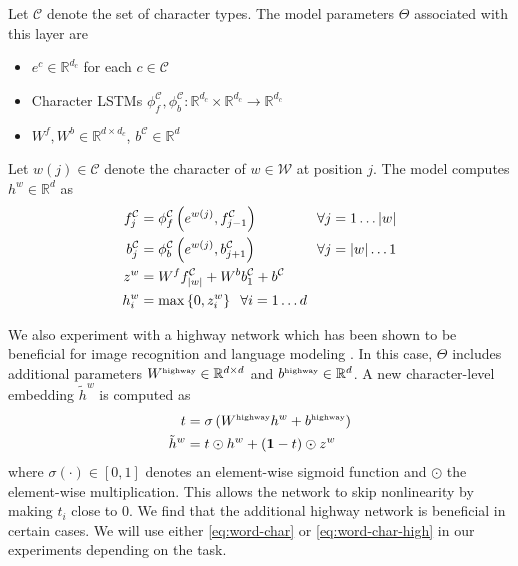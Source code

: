 \documentclass[11pt,letterpaper,UTF8]{article}
\newcommand{\R}{\ensuremath{\mathbb{R}}}
\newcommand{\si}{\ensuremath{\sigma}}
\newcommand{\ra}{\ensuremath{\rightarrow}}
\newcommand{\myset}[1]{\left\{#1\right\}}
\newcommand{\paren}[1]{\left(#1\right)}
\newcommand{\abs}[1]{\left|#1\right|}
\newcommand{\by}{\ensuremath{\times}}
\begin{document}
\begin{CJK}{UTF8}{gbsn}
Let $\mathcal{C}$ denote the set of character types.
The model parameters $\Theta$ associated with this layer are
\begin{itemize}
\item $e^c \in \R^{d_c}$ for each $c \in \mathcal{C}$
\item Character LSTMs $\phi^{\mathcal{C}}_f, \phi^{\mathcal{C}}_b: \R^{d_c} \times \R^{d_c} \ra \R^{d_c}$
\item $W^f, W^b \in \R^{d \by d_c}$,\; $b^{\mathcal{C}} \in \R^d$
\end{itemize}
Let $w(j) \in \mathcal{C}$ denote the character of $w \in \mathcal{W}$ at position $j$.
The model computes $h^w \in \R^d$ as
\begin{align}
f^{\mathcal{C}}_j &= \phi^{\mathcal{C}}_f\paren{e^{w(j)}, f^{\mathcal{C}}_{j-1}} &&\hspace{-1mm}\forall j = 1 \ldots \abs{w}  \notag\\
b^{\mathcal{C}}_j &= \phi^{\mathcal{C}}_b\paren{e^{w(j)}, b^{\mathcal{C}}_{j+1}} &&\hspace{-1mm}\forall j = \abs{w} \ldots 1 \notag\\
z^w &= W^f f^{\mathcal{C}}_{\abs{w}} + W^b b^{\mathcal{C}}_1 + b^{\mathcal{C}} &&\notag\\
h^w_i &= \max\myset{0, z^w_i}\;\; \forall i = 1 \ldots d && \label{eq:word-char}
\end{align}

We also experiment with a highway network \cite{srivastava2015highway} which has been shown to be beneficial for
image recognition \cite{he2015deep} and language modeling \cite{kim2016character}.
In this case, $\Theta$ includes additional parameters $W^{\mbox{\tiny highway}} \in \R^{d \by d}$ and $b^{\mbox{\tiny highway}} \in \R^d$.
A new character-level embedding $\tilde{h}^w$ is computed as
\begin{align}
t &= \si\paren{W^{\mbox{\tiny highway}} h^w + b^{\mbox{\tiny highway}}} \notag \\
\tilde{h}^w &= t \odot h^w + (\textbf{1} - t) \odot z^w \label{eq:word-char-high}
\end{align}
where $\si(\cdot) \in [0,1]$ denotes an element-wise sigmoid function and $\odot$ the element-wise multiplication.
This allows the network to skip nonlinearity by making $t_i$ close to $0$.
We find that the additional highway network is beneficial in certain cases.
We will use either \eqref{eq:word-char} or \eqref{eq:word-char-high} in our experiments depending on the task.



\end{CJK}
\end{document}
